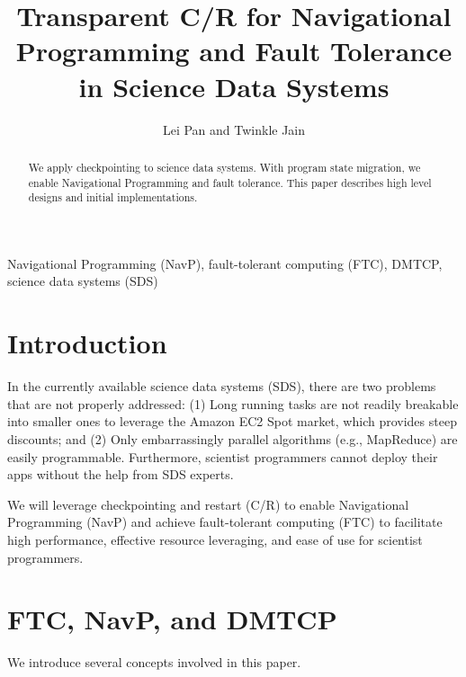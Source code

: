 \documentclass[conference]{IEEEtran}
\begin{document}
\title{Transparent C/R for Navigational Programming and Fault Tolerance in Science Data Systems}

\author{Lei Pan and Twinkle Jain}

\maketitle

\begin{abstract}
We apply checkpointing to science data systems. With program state migration, we enable Navigational Programming and fault tolerance. This paper describes high level designs and initial implementations.
\end{abstract}

\begin{IEEEkeywords}
Navigational Programming (NavP), fault-tolerant computing (FTC), DMTCP, science data systems (SDS)
\end{IEEEkeywords}
\vspace{-2.2mm}
\section{Introduction}
\label{sec:introduction}
In the currently available science data systems (SDS), there are two problems that are not properly addressed: (1) Long running tasks are not readily breakable into smaller ones to leverage the Amazon EC2 Spot market, which provides steep discounts; and (2) Only embarrassingly parallel algorithms (e.g., MapReduce) are easily programmable. Furthermore, scientist programmers cannot deploy their apps without the help from SDS experts.

We will leverage checkpointing and restart (C/R) to enable Navigational Programming (NavP) and achieve fault-tolerant computing (FTC) to facilitate high performance, effective resource leveraging, and ease of use for scientist programmers.

\section{FTC, NavP, and DMTCP}
\label{sec:s1}
We introduce several concepts involved in this paper.
\end{document}

